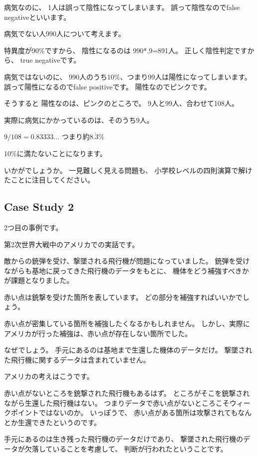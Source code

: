 \documentclass[uplatex,jis2004,dvipdfmx,12pt]{jsarticle}
\begin{document}
病気なのに、
1人は誤って陰性になってしまいます。
誤って陰性なのでfalse negativeといいます。

病気でない人990人について考えます。

特異度が90\%ですから、
陰性になるのは
990*.9=891人。
正しく陰性判定ですから、
true negativeです。

病気ではないのに、
990人のうち10\%、つまり99人は陽性になってしまいます。
誤って陽性になるのでfalse positiveです。
陽性なのでピンクです。

そうすると
陽性なのは、ピンクのところで。
9人と99人、合わせて108人。

実際に病気にかかっているのは、そのうち9人。

$9/108=0.83333\dots$
つまり約$8.\dot{3}\%$

10\%に満たないことになります。

いかがでしょうか。
一見難しく見える問題も、
小学校レベルの四則演算で解けたことに注目してください。

\subsection{Case Study 2}

2つ目の事例です。

第2次世界大戦中のアメリカでの実話です。


敵からの銃弾を受け、撃墜される飛行機が問題になっていました。
銃弾を受けながらも基地に戻ってきた飛行機のデータをもとに、
機体をどう補強すべきかが課題となりました。

赤い点は銃撃を受けた箇所を表しています。
どの部分を補強すればいいかでしょう。

赤い点が密集している箇所を補強したくなるかもしれません。
しかし、実際にアメリカが行った補強は、赤い点が存在しない箇所でした。


なぜでしょう。
手元にあるのは基地まで生還した機体のデータだけ。
撃墜された飛行機に関するデータは含まれていません。

アメリカの考えはこうです。

赤い点がないところを銃撃された飛行機もあるはず。
ところがそこを銃撃されながら生還した飛行機はない。
つまりデータで赤い点がないところこそウィークポイントではないのか。
いっぽうで、
赤い点がある箇所は攻撃されてもなんとか生還できたというのです。

手元にあるのは生き残った飛行機のデータだけであり、
撃墜された飛行機のデータが欠落していることを考慮して、
判断が行われたということです。
\end{document}
